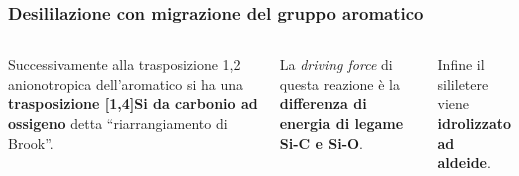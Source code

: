 
\begin{frame}\frametitle{Desililazione con migrazione del gruppo aromatico}
\begin{columns}
Successivamente alla trasposizione 1,2 anionotropica dell'aromatico si ha una {\bf trasposizione [1,4]Si da carbonio ad ossigeno} detta ``riarrangiamento di Brook''. 

{

La \emph{driving force} di questa reazione è la {\bf differenza di energia di legame Si-C e Si-O}. 

Infine il sililetere viene {\bf idrolizzato ad aldeide}.}

\end{columns}


\end{frame}

